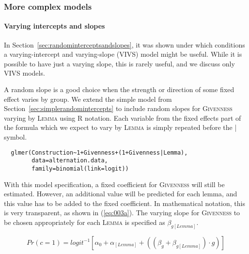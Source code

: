 \subsubsection{More complex models}
\label{sec:morecomplexmodels}

\paragraph{Varying intercepts and slopes}

In Section~\ref{sec:randominterceptsandslopes}, it was shown under which conditions a varying-intercept and varying-slope (VIVS) model might be useful.
While it is possible to have just a varying slope, this is rarely useful, and we discuss only VIVS models.

A random slope is a good choice when the strength or direction of some fixed effect varies by group.
We extend the simple model from Section~\ref{sec:simplerandomintercepts} to include random slopes for \textsc{Givenness} varying by \textsc{Lemma} using R notation.
Each variable from the fixed effects part of the formula which we expect to vary by \textsc{Lemma} is simply repeated before the | symbol.

\begin{lstlisting}
  glmer(Construction~1+Givenness+(1+Givenness|Lemma),
        data=alternation.data,
        family=binomial(link=logit))
\end{lstlisting}

With this model specification, a fixed coefficient for \textsc{Givenness} will still be estimated.
However, an additional value will be predicted for each lemma, and this value has to be added to the fixed coefficient.
In mathematical notation, this is very transparent, as shown in (\ref{eq:003a}).
The varying slope for \textsc{Givenness} to be chosen appropriately for each \textsc{Lemma} is specified as $\beta_{g[Lemma]}$.

\begin{equation}
  Pr(c=1)=logit^{-1}\left[\alpha_0+\alpha_{[Lemma]}+((\beta_{g}+\beta_{g[Lemma]}) \cdot g)\right]
  \label{eq:003a}
\end{equation}

